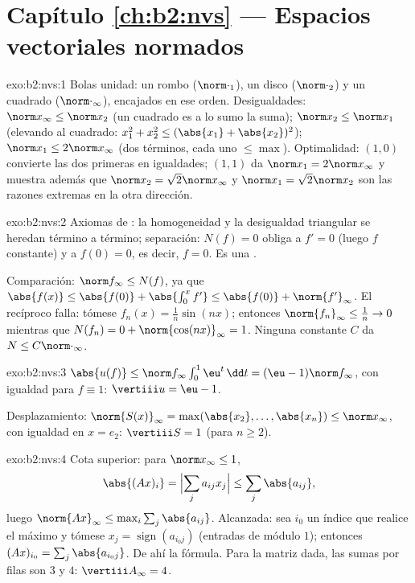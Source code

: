 \section*{Capítulo \ref{ch:b2:nvs} --- Espacios vectoriales normados}

\begin{solution}{exo:b2:nvs:1}
Bolas unidad: un rombo ($\norm\cdot_1$), un disco ($\norm\cdot_2$) y
un cuadrado ($\norm\cdot_\infty$), encajados en ese orden.
Desigualdades: $\norm x_\infty \leq \norm x_2$ (un cuadrado es a lo
sumo la suma); $\norm x_2 \leq \norm x_1$ (elevando al cuadrado:
$x_1^2 + x_2^2 \leq (\abs{x_1} + \abs{x_2})^2$); $\norm x_1 \leq
2\norm x_\infty$ (dos términos, cada uno $\leq \max$). Optimalidad:
$(1, 0)$ convierte las dos primeras en igualdades; $(1, 1)$ da
$\norm x_1 = 2\norm x_\infty$ y muestra además que $\norm x_2 =
\sqrt2 \norm x_\infty$ y $\norm x_1 = \sqrt2 \norm x_2$ son las
razones extremas en la otra dirección.
\end{solution}

\begin{solution}{exo:b2:nvs:2}
Axiomas de : la homogeneidad y la desigualdad triangular se
heredan término a término; separación: $N(f) = 0$ obliga a $f' = 0$
(luego $f$ constante) y a $f(0) = 0$, es decir, $f = 0$. Es una
.

Comparación: $\norm f_\infty \leq N(f)$, ya que $\abs{f(x)} \leq
\abs{f(0)} + \abs{\int_0^x f'} \leq \abs{f(0)} + \norm{f'}_\infty$.
El recíproco falla: tómese $f_n(x) = \frac1n \sin(nx)$; entonces
$\norm{f_n}_\infty \leq \frac1n \to 0$ mientras que $N(f_n) = 0 +
\norm{\cos(nx)}_\infty = 1$. Ninguna constante $C$ da $N \leq
C\norm\cdot_\infty$.
\end{solution}

\begin{solution}{exo:b2:nvs:3}
$\abs{u(f)} \leq \norm f_\infty \int_0^1 \eu^t\,\dd t = (\eu -
1)\norm f_\infty$, con igualdad para $f \equiv 1$: $\vertiii u = \eu
- 1$.

Desplazamiento: $\norm{S(x)}_\infty = \max(\abs{x_2}, \dots,
\abs{x_n}) \leq \norm x_\infty$, con igualdad en $x = e_2$: $\vertiii
S = 1$ (para $n \geq 2$).
\end{solution}

\begin{solution}{exo:b2:nvs:4}
Cota superior: para $\norm x_\infty \leq 1$,
\[
\abs{(Ax)_i} = \Bigl|\sum_j a_{ij}x_j\Bigr| \leq \sum_j
\abs{a_{ij}},
\]
luego $\norm{Ax}_\infty \leq \max_i \sum_j \abs{a_{ij}}$. Alcanzada:
sea $i_0$ un índice que realice el máximo y tómese $x_j =
\operatorname{sign}(a_{i_0 j})$ (entradas de módulo $1$); entonces
$(Ax)_{i_0} = \sum_j \abs{a_{i_0 j}}$. De ahí la fórmula. Para la
matriz dada, las sumas por filas son $3$ y $4$: $\vertiii A_\infty =
4$.
\end{solution}

